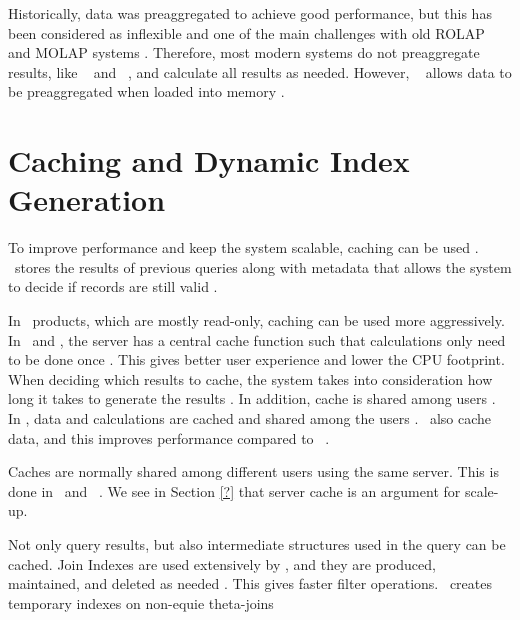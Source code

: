 Historically, data was preaggregated to achieve good performance, but this has been considered as inflexible and one of the main challenges with old ROLAP and MOLAP systems \cite{Boncz2002-yj}. Therefore, most modern systems do not preaggregate results, like \sapnw~\cite{Lemke2010-is} and \qlikview~\cite{Qlik2014-vd}, and calculate all results as needed. However, \qlikview~ allows data to be preaggregated when loaded into memory \cite{Qlik2011-yc}.



\section{Caching and Dynamic Index Generation}
\label{sec:Caching}
To improve performance and keep the system scalable, caching can be used \cite{Plattner2014-fr}. \exasol~stores the results of previous queries along with metadata that allows the system to decide if records are still valid \cite{Exasol2014-xh}. 

In \bd~products, which are mostly read-only, caching can be used more aggressively. In \qlikview~and \tableau, the server has a central cache function such that calculations only need to be done once \cite{Kamkolkar2015-iq, Qlik2011-ef}. This gives better user experience and lower the CPU footprint. When deciding which results to cache, the system takes into consideration how long it takes to generate the results \cite{noauthor_undateds-js}. In addition, cache is shared among users \cite{Qlik2011-yc}. In \tableau, data and calculations are cached and shared among the users \cite{Kamkolkar2015-iq}. \vertipaq~also cache data, and this improves performance compared to \mssql~\cite{Ferrari2012-hm}.

Caches are normally shared among different users using the same server. This is done in \qlikview~and \tableau~\cite{Kamkolkar2015-iq Qlik2011-yc}. We see in Section \ref{?} that server cache is an argument for scale-up.

Not only query results, but also intermediate structures used in the query can be cached. Join Indexes are used extensively by \exasol, and they are produced, maintained, and deleted as needed \cite{Exasol2014-xh}. This gives faster filter operations. \monetxq~creates temporary indexes on non-equie theta-joins \cite{Boncz2006-md}

